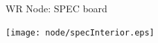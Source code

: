 \documentclass[compress,red]{beamer}
\begin{document}
\begin{frame}{WR Node: SPEC board}

    \begin{center}
    \texttt{[image: node/specInterior.eps]}
    \end{center}

\end{frame}
\end{document}
